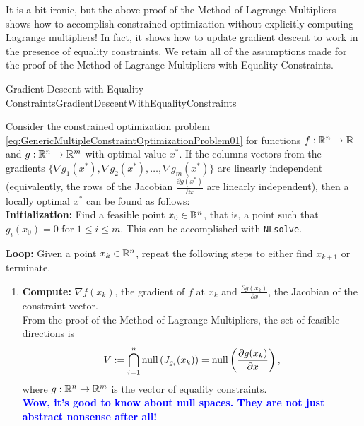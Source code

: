 It is a bit ironic, but the above proof of the Method of Lagrange Multipliers shows how to accomplish constrained optimization without explicitly computing Lagrange multipliers! In fact, it shows how to update gradient descent to work in the presence of equality constraints. We retain all of the assumptions made for the proof of the Method of Lagrange Multipliers with Equality Constraints.

\begin{methodColor}{Gradient Descent with Equality Constraints}{GradientDescentWithEqualityConstraints} 

Consider the constrained optimization problem \eqref{eq:GenericMultipleConstraintOptimizationProblem01} for functions $f:\mathbb R^n \to \mathbb R$ and $g:\mathbb R^n \to \mathbb R^m$ with optimal value $x^\ast$. If the columns vectors from the  gradients $\{ \nabla g_1(x^\ast),  \nabla g_2(x^\ast), \ldots,  \nabla g_m(x^\ast)\}$ are linearly independent  (equivalently, the rows of the Jacobian $\frac{ \partial g(x^\ast)}{\partial x} $ are linearly independent), then a locally optimal $x^\ast$ 
can be found as follows: \\


\textbf{Initialization:} Find a feasible point $x_0\in \mathbb R^n$, that is, a point such that $g_i(x_0) = 0$ for $1 \le i \le m$. This can be accomplished with \texttt{NLsolve}.

\bigskip

\textbf{Loop:} Given a point $x_k \in \mathbb R^n$, repeat the following steps to either find $x_{k+1}$ or terminate.

\begin{enumerate}
\renewcommand{\labelenumi}{(\alph{enumi})}
\setlength{\itemsep}{.2cm}

    \item \textbf{Compute:} $\nabla f(x_k)$, the gradient of $f$ at $x_k$ and $\frac{\partial g(x_k)}{\partial x}$, the Jacobian of the constraint vector. \\

  From the proof of the Method of Lagrange Multipliers, the set of feasible directions is
    $$V:= \bigcap_{i=1}^n \mathrm{null}\left(  J_{g_i}(x_k) \right) = \mathrm{null} \left(\frac{\partial g(x_k)}{\partial x}\right),$$  where $g:\mathbb R^n \to \mathbb R^m$ is the vector of equality constraints. \\
    
    \textcolor{blue}{\bf Wow, it's good to know about null spaces. They are not just abstract nonsense after all!}\\


\end{enumerate}
\end{methodColor}
